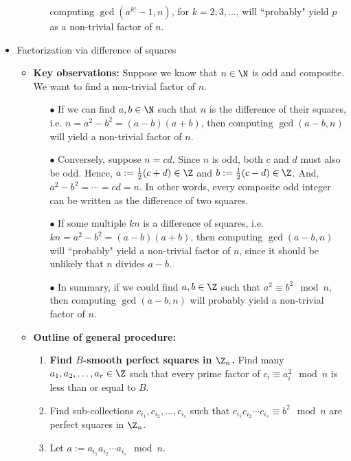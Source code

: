 \begin{itemize}
\begin{itemize}
\begin{itemize}
								computing $\gcd(a^{k!}-1,n)$, for $k = 2,3,\ldots$, will ``probably" yield
								$p$ as a non-trivial factor of $n$.
				\end{itemize}
		\end{itemize}
\item	Factorization via difference of squares
		\begin{itemize}
		\item	\textbf{Key observations:}\vskip 0.1cm
				Suppose we know that $n \in \N$ is odd and composite.
				We want to find a non-trivial factor of $n$.
				\begin{itemize}
				\item[$\bullet$]	If we can find $a, b\in\N$ such that $n$ is the difference of their squares,
								i.e. $n = a^{2} - b^{2} = (a-b)(a+b)$,
								then computing $\gcd(a-b,n)$ will yield a non-trivial factor of $n$.
				\item[$\bullet$]	Conversely, suppose $n = cd$.  Since $n$ is odd, both $c$ and $d$
								must also be odd.
								Hence, $a := \frac{1}{2}(c+d) \in \Z$ and $b := \frac{1}{2}(c-d) \in \Z$.
								And, $a^{2} - b^{2} = \cdots = cd = n$.
								In other words, every composite odd integer can be written as the
								difference of two squares.
				\item[$\bullet$]	If some multiple $kn$ is a difference of squares, i.e.
								$kn = a^{2} - b^{2} = (a-b)(a+b)$,
								then computing $\gcd(a-b,n)$ will ``probably" yield a non-trivial factor
								of $n$, since it should be unlikely that $n$ divides $a-b$.
				\item[$\bullet$]	{\color{red}In summary, if we could find $a,b\in\Z$ such that
								$a^{2} \equiv b^{2} \mod n$, then computing $\gcd(a-b,n)$ will
								probably yield a non-trivial factor of $n$.}
				\end{itemize}
		\item	\textbf{Outline of general procedure:}\vskip 0.1cm
				\begin{enumerate}
				\item	\textbf{Find $B$-smooth perfect squares in $\Z_{n}$.}
						Find many $a_{1}, a_{2}, \ldots, a_{r} \in \Z$ such that
						every prime factor of $c_{i} \equiv a_{i}^{2}\mod n$ is less than or equal to $B$.
				\item	Find sub-collections $c_{i_{1}}, c_{i_{2}}, \ldots, c_{i_{s}}$ such that
						$c_{i_{1}} c_{i_{2}} \cdots c_{i_{s}} \equiv b^{2} \mod n$ are
						perfect squares in $\Z_{n}$.
				\item	Let $a := a_{i_{1}} a_{i_{2}} \cdots a_{i_{s}} \mod n$.

\end{enumerate}
\end{itemize}
\end{itemize}
